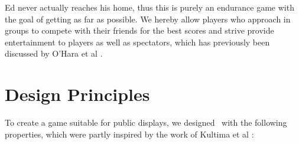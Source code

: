 \documentclass{chi-ext}
\begin{document}
Ed never actually reaches his home, thus this is purely an endurance game with the goal of getting as far as possible. We hereby allow players who approach in groups to compete with their friends for the best scores and strive provide entertainment to players as well as spectators, which has previously been discussed by O'Hara et al \cite{ohara2008understanding}.\\


%

\section{Design Principles}
%
To create a game suitable for public displays, we designed \drunkened\ with the following properties, which were partly inspired by the work of Kultima et al \cite{kultima2009casual}:
\end{document}

